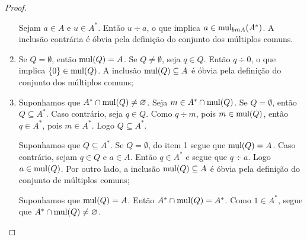 \begin{proof}
\begin{enumerate}
	Sejam $a \in A$ e $u \in A^*$. Então $u \div a$, o que implica $a \in \operatorname{mul}_{\\bm A}(A^*)$. A inclusão contrária é óbvia pela definição do conjunto dos múltiplos comuns.

	\item Se $Q = \emptyset$, então $\operatorname{mul}(Q) = A$. Se $Q \neq \emptyset$, seja $q \in Q$. Então $q \div 0$, o que implica $\{0\} \in \operatorname{mul}(Q)$. A inclusão $\operatorname{mul}(Q) \subseteq A$ é óbvia pela definição do conjunto dos múltiplos comuns;

	\item Suponhamos que $A^* \cap \operatorname{mul}(Q) \neq \varnothing$. Seja $m \in A^* \cap \operatorname{mul}(Q)$. Se $Q = \emptyset$, então $Q \subseteq A^*$. Caso contrário, seja $q \in Q$. Como $q \div m$, pois $m \in \operatorname{mul}(Q)$, então $q \in A^*$, pois $m \in A^*$. Logo $Q \subseteq A^*$.

	Suponhamos que $Q \subseteq A^*$. Se $Q = \emptyset$, do item 1 segue que $\operatorname{mul}(Q)=A$. Caso contrário, sejam $q \in Q$ e $a \in A$. Então $q \in A^*$ e segue que $q \div a$. Logo $a \in \operatorname{mul}(Q)$. Por outro lado, a  inclusão $\operatorname{mul}(Q) \subseteq A$ é óbvia pela definição do conjunto de múltiplos comuns;

	Suponhamos que $\operatorname{mul}(Q) = A$. Então $A^* \cap \operatorname{mul}(Q) = A^*$. Como $1 \in A^*$, segue que $A^* \cap \operatorname{mul}(Q) \neq \varnothing$. \qedhere
	\end{enumerate}
\end{proof}




